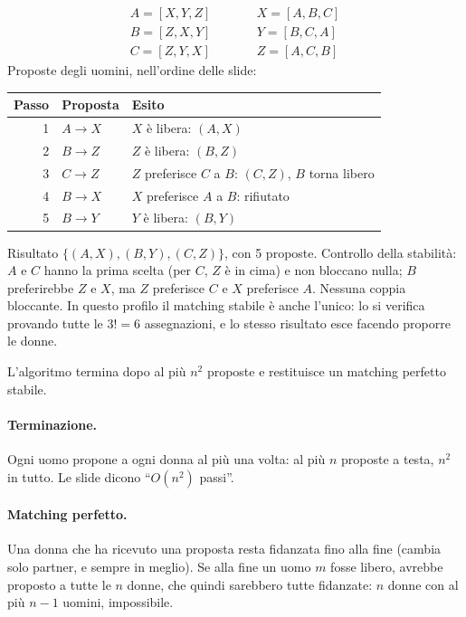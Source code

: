 \begin{esempio}
\[
\begin{array}{lll}
  A = [X, Y, Z] & \qquad & X = [A, B, C] \\
  B = [Z, X, Y] & \qquad & Y = [B, C, A] \\
  C = [Z, Y, X] & \qquad & Z = [A, C, B]
\end{array}
\]
Proposte degli uomini, nell'ordine delle slide:
\begin{center}
\renewcommand{\arraystretch}{1.15}
\begin{tabular}{rll}
\toprule
Passo & Proposta & Esito \\
\midrule
1 & $A \to X$ & $X$ è libera: $(A, X)$ \\
2 & $B \to Z$ & $Z$ è libera: $(B, Z)$ \\
3 & $C \to Z$ & $Z$ preferisce $C$ a $B$: $(C, Z)$, $B$ torna libero \\
4 & $B \to X$ & $X$ preferisce $A$ a $B$: rifiutato \\
5 & $B \to Y$ & $Y$ è libera: $(B, Y)$ \\
\bottomrule
\end{tabular}
\end{center}
Risultato $\{(A, X), (B, Y), (C, Z)\}$, con 5 proposte. Controllo della stabilità: $A$ e
$C$ hanno la prima scelta (per $C$, $Z$ è in cima) e non bloccano nulla; $B$ preferirebbe
$Z$ e $X$, ma $Z$ preferisce $C$ e $X$ preferisce $A$. Nessuna coppia bloccante. In questo
profilo il matching stabile è anche l'unico: lo si verifica provando tutte le $3! = 6$
assegnazioni, e lo stesso risultato esce facendo proporre le donne.
\end{esempio}

\begin{teorema}
L'algoritmo termina dopo al più $n^2$ proposte e restituisce un matching perfetto stabile.
\end{teorema}
\paragraph{Terminazione.} Ogni uomo propone a ogni donna al più una volta: al più $n$
proposte a testa, $n^2$ in tutto. Le slide dicono ``$O(n^2)$ passi''.

\paragraph{Matching perfetto.} Una donna che ha ricevuto una proposta resta fidanzata fino
alla fine (cambia solo partner, e sempre in meglio). Se alla fine un uomo $m$ fosse libero,
avrebbe proposto a tutte le $n$ donne, che quindi sarebbero tutte fidanzate: $n$ donne con
al più $n - 1$ uomini, impossibile.

